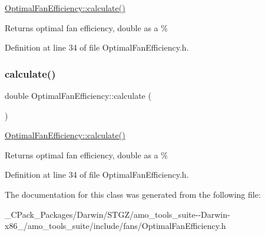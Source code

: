 \hyperlink{class_optimal_fan_efficiency_ac35291d1095c74373393ac510e45ae02}{Optimal\+Fan\+Efficiency\+::calculate()} \begin{DoxyReturn}{Returns}
optimal fan efficiency, double as a \% 
\end{DoxyReturn}


Definition at line 34 of file Optimal\+Fan\+Efficiency.\+h.

\mbox{\label{class_optimal_fan_efficiency_ac35291d1095c74373393ac510e45ae02}} 
\subsubsection{\texorpdfstring{calculate()}{calculate()}\hspace{0.1cm}{\footnotesize\ttfamily [3/3]}}
{\footnotesize\ttfamily double Optimal\+Fan\+Efficiency\+::calculate (\begin{DoxyParamCaption}{ }\end{DoxyParamCaption})\hspace{0.3cm}{\ttfamily [inline]}}

\hyperlink{class_optimal_fan_efficiency_ac35291d1095c74373393ac510e45ae02}{Optimal\+Fan\+Efficiency\+::calculate()} \begin{DoxyReturn}{Returns}
optimal fan efficiency, double as a \% 
\end{DoxyReturn}


Definition at line 34 of file Optimal\+Fan\+Efficiency.\+h.



The documentation for this class was generated from the following file\+:\begin{DoxyCompactItemize}
\item 
\+\_\+\+C\+Pack\+\_\+\+Packages/\+Darwin/\+S\+T\+G\+Z/amo\+\_\+tools\+\_\+suite-\/-\/\+Darwin-\/x86\+\_/amo\+\_\+tools\+\_\+suite/include/fans/Optimal\+Fan\+Efficiency.\+h\end{DoxyCompactItemize}
